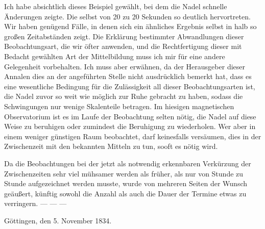 Ich habe absichtlich dieses Beispiel gewählt, bei dem die Nadel schnelle Änderungen zeigte. Die selbst von 20 zu 20 Sekunden so deutlich hervortreten. Wir haben genügend Fälle, in denen sich ein ähnliches Ergebnis selbst in halb so großen Zeitabständen zeigt. Die Erklärung bestimmter Abwandlungen dieser Beobachtungsart, die wir öfter anwenden, und die Rechtfertigung dieser mit Bedacht gewählten Art der Mittelbildung muss ich mir für eine andere Gelegenheit vorbehalten. Ich muss aber erwähnen, da der Herausgeber dieser Annalen dies an der angeführten Stelle nicht ausdrücklich bemerkt hat, dass es eine wesentliche Bedingung für die Zulässigkeit all dieser Beobachtungsarten ist, die Nadel zuvor so weit wie möglich zur Ruhe gebracht zu haben, sodass die Schwingungen nur wenige Skalenteile betragen. Im hiesigen magnetischen Observatorium ist es im Laufe der Beobachtung selten nötig, die Nadel auf diese Weise zu beruhigen oder zumindest die Beruhigung zu wiederholen. Wer aber in einem weniger günstigen Raum beobachtet, darf keinesfalls versäumen, dies in der Zwischenzeit mit den bekannten Mitteln zu tun, sooft es nötig wird.

Da die Beobachtungen bei der jetzt als notwendig erkennbaren Verkürzung der Zwischenzeiten sehr viel mühsamer werden als früher, als nur von Stunde zu Stunde aufgezeichnet werden musste, wurde von mehreren Seiten der Wunsch geäußert, künftig sowohl die Anzahl als auch die Dauer der Termine etwas zu verringern. — — —

Göttingen, den 5. November 1834.

